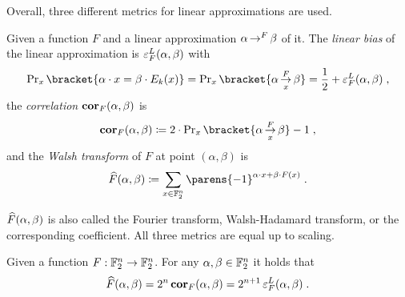 Overall, three different metrics for linear approximations are used.
\begin{definition}\label{def:bias-cor-walsh}
    Given a function $F$ and a linear approximation $\alpha \operatorname*{\rightarrow}^{F}_{} \beta$ of it.
    The \emph{linear bias} of the linear approximation is $\operatorname{\varepsilon}^L_{F}(\alpha, \beta)$ with
    \begin{equation*}
        \Prob_x\bracket{\iprod{\alpha}{x} = \iprod{\beta}{E_k(x)}} = \Prob_x\bracket{\propLin{\alpha}{F}{x}{\beta}} = \frac{1}{2} + \bias^L_{F}(\alpha, \beta)\;,
    \end{equation*}
    the \emph{correlation} $\operatorname{\mathbf{cor}}_{F}(\alpha, \beta)$ is
    \begin{equation*}
        \cor_{F}(\alpha, \beta) \coloneqq 2 \cdot \Prob_x\bracket{\propLin{\alpha}{F}{x}{\beta}} - 1\;,
    \end{equation*}
    and the \emph{Walsh transform} of $F$ at point $(\alpha, \beta)$ is
    \begin{equation*}
        \FC{F}(\alpha, \beta) \coloneqq \sum_{x \in \F_2^n} \parens{-1}^{\iprod{\alpha}{x} + \iprod{\beta}{F(x)}}\;.
    \end{equation*}
\end{definition}
$\widehat{F}(\alpha, \beta)$ is also called the Fourier transform, Walsh-Hadamard transform, or the corresponding coefficient.
All three metrics are equal up to scaling.
\begin{lemma}
    Given a function $F : \mathbb{F}_2^n \to \mathbb{F}_2^n$.
    For any $\alpha, \beta \in \mathbb{F}_2^n$ it holds that
    \begin{equation*}
        \widehat{F}(\alpha, \beta) = 2^n \operatorname{\mathbf{cor}}_{F}(\alpha, \beta) = 2^{n+1} \operatorname{\varepsilon}^L_{F}(\alpha, \beta)\;.
    \end{equation*}
\end{lemma}
